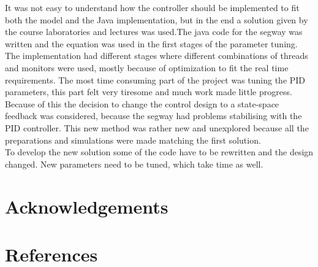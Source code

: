 \documentclass[a4paper]{article}
\begin{document}
It was not easy to understand how the controller should be implemented to fit both the model and the Java implementation, but in the end a solution given by the course laboratories and lectures was used.The java code for the segway was written and the equation was used in the first stages of the parameter tuning. The implementation had different stages where different combinations of threads and monitors were used, mostly because of optimization to fit the real time requirements. The most time consuming part of the project was tuning the PID parameters, this part felt very tiresome and much work made little progress. Because of this the decision to change the control design to a state-space feedback was considered, because the segway had problems stabilising with the PID controller. This new method was rather new and unexplored because all the preparations and simulations were made matching the first solution. \\

To develop the new solution some of the code have to be rewritten and the design changed. New parameters need to be tuned, which take time as well. \\


\section{Acknowledgements}

\section{References}
\end{document}
